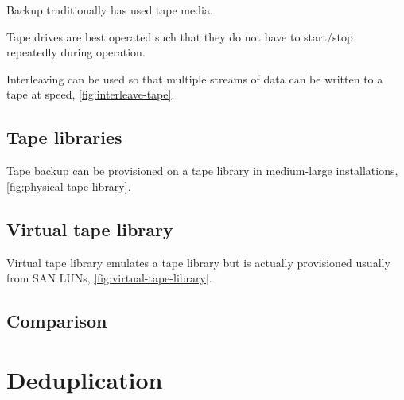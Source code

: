 \documentclass[slides]{pgnotes}
\begin{document}
Backup traditionally has used tape media.

Tape drives are best operated such that they do not have to start/stop
repeatedly during operation.

Interleaving can be used so that multiple
streams of data can be written to a tape at speed, \autoref{fig:interleave-tape}.


\subsection{Tape libraries}
\label{sec:tape-libraries}

Tape backup can be provisioned on a tape library in medium-large
installations, \autoref{fig:physical-tape-library}.


\subsection{Virtual tape library}
\label{sec:virtual-tape-library}

Virtual tape library emulates a tape library but is actually provisioned
usually from SAN LUNs, \autoref{fig:virtual-tape-library}.


\subsection{Comparison}


\section{Deduplication}


\end{document}

